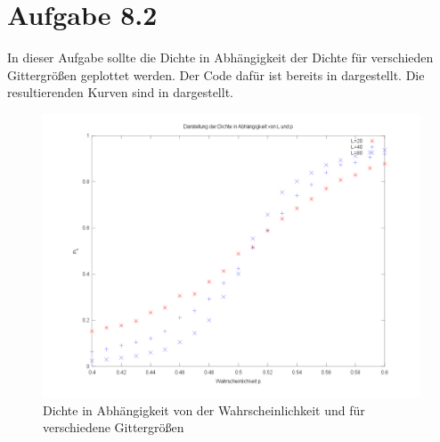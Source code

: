 \section*{Aufgabe 8.2}
In dieser Aufgabe sollte die Dichte in Abhängigkeit der Dichte für verschieden Gittergrößen
geplottet werden. Der Code dafür ist bereits in  dargestellt. Die
resultierenden Kurven sind in  dargestellt.

\begin{figure}[htb]
  \centering
  \includegraphics[width=0.8\columnwidth,keepaspectratio]{../tmp/zweitens.png}
  \caption{Dichte in Abhängigkeit von der Wahrscheinlichkeit und für verschiedene Gittergrößen}
  \label{fig:dichte}
\end{figure}